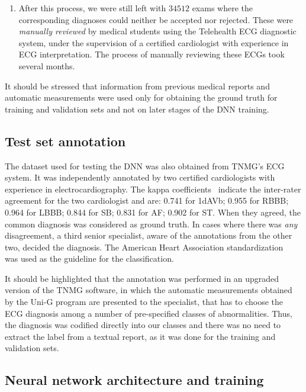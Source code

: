 \documentclass{article}
\begin{document}
\begin{enumerate}
\item After this process, we were still left with $34512$ exams where the corresponding diagnoses could neither be accepted nor rejected. These were \textit{manually reviewed} by medical students using the Telehealth ECG diagnostic system, under the supervision of a certified cardiologist with experience in ECG interpretation. The process of manually reviewing these ECGs took several months.
\end{enumerate}

It should be stressed that information from previous medical reports and automatic measurements were used only for obtaining the ground truth for training and validation sets and not on later stages of the DNN training. 

\subsection{Test set annotation}

The dataset used for testing the DNN was also obtained from TNMG's ECG system. It was independently annotated by two certified cardiologists with experience in electrocardiography. The kappa coefficients~\cite{cohen_coefficient_1960} indicate the inter-rater agreement for the two cardiologist and are: 0.741 for 1dAVb; 0.955 for RBBB; 0.964 for LBBB; 0.844 for SB; 0.831 for AF; 0.902 for ST. When they agreed, the common diagnosis was considered as ground truth. In cases where there was  \textit{any} disagreement, a third senior specialist, aware of the annotations from the other two, decided the diagnosis. The American Heart Association standardization~\cite{kligfield_recommendations_2007} was used as the guideline for the classification. 

It should be highlighted that the annotation was performed in an upgraded version of the TNMG software, in which the automatic measurements obtained by the Uni-G program are presented to the specialist, that has to choose the ECG diagnosis among a number of pre-specified classes of abnormalities. Thus, the diagnosis was codified directly into our classes and there was no need to extract the label from a textual report, as it was done for the training and validation sets.

\subsection{Neural network architecture and training}
\label{sec:Model}
\end{document}
